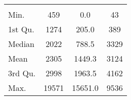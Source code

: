\begin{tabular}{lS[table-format=5.1]S[table-format=5.1]S[table-format=5.1]}
&  &  &  \\
 Min.    & 459 & 0.0 & 43 \\
 1st Qu. & 1274 & 205.0 & 389 \\
 Median  & 2022 & 788.5 & 3329 \\
 Mean    & 2305 & 1449.3 & 3124 \\
 3rd Qu. & 2998 & 1963.5 & 4162 \\
 Max.    & 19571 & 15651.0 & 9536 \\
\end{tabular}
